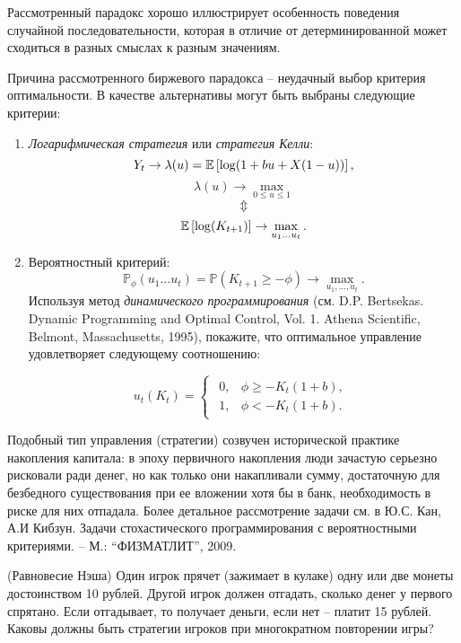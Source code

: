 \begin{remark}
Рассмотренный парадокс хорошо иллюстрирует особенность поведения случайной последовательности, которая в отличие от детерминированной может сходиться в разных смыслах к разным значениям. 

Причина рассмотренного биржевого парадокса -- неудачный выбор критерия оптимальности. В качестве альтернативы могут быть выбраны следующие критерии:

\begin{enumerate}
\item \textit{Логарифмическая стратегия} или \textit{стратегия Келли}:
\[
Y_t \rightarrow \lambda(u) = \mathrm{{\mathbb E}}\left[ \log (1 + b u + X (1-u)) \right],
\]
\[
\lambda(u) \rightarrow \max \limits_{ 0 \leq u \leq 1}
\]
\[
\Updownarrow
\]
\[
\mathrm{{\mathbb E}}\left[ \log (K_{t+1}) \right] \rightarrow \max \limits_{ u_1 \ldots u_t }.
\]

\item Вероятностный критерий:
\[
\mathbb{P}_\phi (u_1 \ldots u_t ) = \mathbb{P} (K_{t+1} \geq -\phi) \rightarrow \max \limits_{ u_1, \ldots, u_t }.
\]
Используя метод \textit{динамического программирования} (см. D.P. Bertsekas. Dynamic Programming and Optimal Control, Vol. 1.  Athena Scientific, Belmont, Massachusetts, 1995), покажите, что оптимальное управление удовлетворяет следующему соотношению: 

\[
u_t(K_t) = \begin{cases}
\begin{array}{cc}
0, & \phi \geq - K_t(1+b), \\
1, & \phi < - K_t(1+b).
\end{array}\end{cases}
\]

\end{enumerate}

Подобный тип управления (стратегии) созвучен исторической практике накопления капитала: в эпоху первичного накопления люди зачастую серьезно рисковали ради денег, но как только они накапливали сумму, достаточную для безбедного существования при ее вложении хотя бы в банк, необходимость в риске для них отпадала. Более детальное рассмотрение задачи см. в Ю.С. Кан, А.И Кибзун. Задачи стохастического программирования с вероятностными критериями. --  М.: ``ФИЗМАТЛИТ'', 2009. 
\end{remark} 
 


\begin{problem}(Равновесие Нэша)
Один игрок прячет (зажимает в кулаке) одну или две монеты достоинством 10 рублей. Другой игрок должен отгадать, сколько денег у первого спрятано. Если отгадывает, то получает деньги, если нет -- платит 15 рублей. Каковы  должны быть стратегии игроков при многократном повторении игры?

\end{problem}

